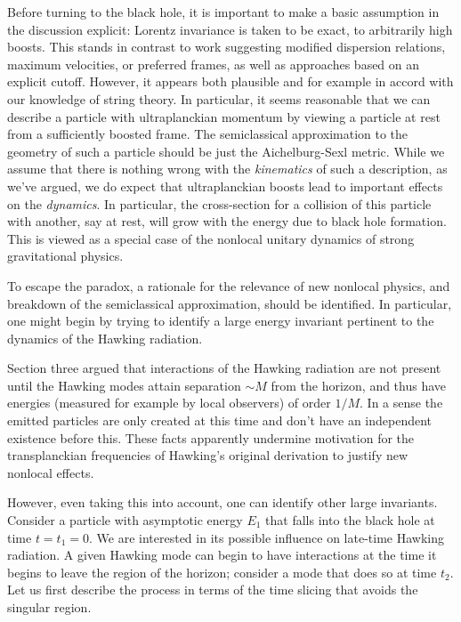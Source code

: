 Before turning to the black hole, it is important to make a basic assumption in the discussion explicit:  
Lorentz invariance is taken to be exact, to arbitrarily high boosts.  This stands in contrast to work suggesting modified dispersion relations, maximum velocities, or preferred frames, as well as approaches based on an explicit cutoff.  However, it appears both plausible and for example in accord with our knowledge of string theory.  In particular, it seems reasonable that we can describe a particle with ultraplanckian momentum by viewing a particle at rest from a sufficiently boosted frame.  The semiclassical approximation to the geometry of such a particle should be just the Aichelburg-Sexl metric.
While we assume that there is nothing wrong with the {\it kinematics} of such a description, as we've argued, we do expect that ultraplanckian boosts lead to important effects on the 
 {\it dynamics}. In particular, the cross-section for a collision of this particle with another, say at rest, will grow with the energy due to black hole formation.   This is viewed as a special case of the nonlocal unitary dynamics of strong gravitational physics.

  


To escape the paradox,  a rationale for the relevance of new nonlocal physics, and breakdown of the semiclassical approximation, should  be identified.  In particular, one might begin by trying to identify a large energy invariant pertinent to the dynamics of the Hawking radiation.

Section three argued that interactions of the Hawking radiation are not present until the Hawking modes attain separation $\sim M$ from the horizon, and thus have energies (measured for example by local observers) of order $1/M$.   In a sense the emitted particles are only created at this time and don't have an independent existence before this.
These facts apparently undermine  motivation for the transplanckian frequencies of Hawking's original derivation to justify new nonlocal effects.


However, even taking this into account, one can  identify other large invariants.  Consider a particle with asymptotic energy $E_1$ that falls into the black hole at time $t=t_1=0$.  We are interested in its possible influence on late-time Hawking radiation.    A given Hawking mode can begin to have interactions at the time it begins to leave the region of the horizon; consider a mode that does so at time $t_2$.  Let us first describe the process in terms of the time slicing that avoids the singular region.

